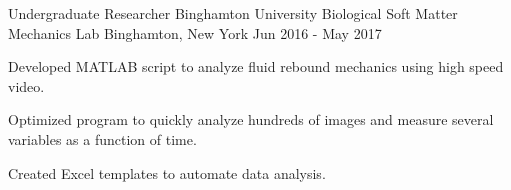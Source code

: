 

\begin{cventries}

  \cventry
    {Undergraduate Researcher} %
    {Binghamton University Biological Soft Matter Mechanics Lab} %
    {Binghamton, New York} %
    {Jun 2016 - May 2017} %
    {
      \begin{cvitems} %
        \item {Developed MATLAB script to analyze fluid rebound mechanics using high speed video.}
        \item {Optimized program to quickly analyze hundreds of images and measure several variables as a function of time.}
        \item {Created Excel templates to automate data analysis.}
      \end{cvitems}
    }

\end{cventries}
